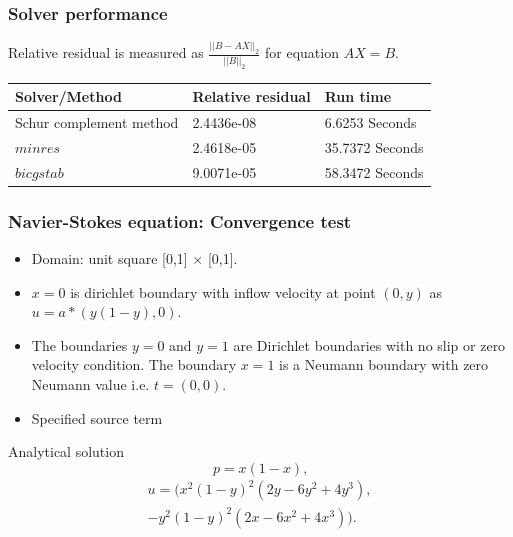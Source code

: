 \documentclass{beamer}
\begin{document}
\begin{frame}
\frametitle{Solver performance}

Relative residual is measured as $\frac{||B-AX||_2}{||B||_2}$ for equation $AX=B$.

\begin{longtable}{| p{} | p{} | p{} |}
\hline
\textbf{Solver/Method} & \textbf{Relative residual} & \textbf{Run time}\\
\hline
Schur complement method & 2.4436e-08 & 6.6253 Seconds\\
\hline
$minres$ & 2.4618e-05 & 35.7372 Seconds\\
\hline
$bicgstab$ & 9.0071e-05 & 58.3472 Seconds\\
\hline
\end{longtable}

\end{frame}
\begin{frame}
\frametitle{Navier-Stokes equation: Convergence test}
\begin{itemize}
\item Domain: unit square [0,1] $\times$ [0,1].
\item ${x=0}$ is dirichlet boundary with inflow velocity at point $(0,y)$ as $u = a*(y(1-y), 0)$.
\item The boundaries ${y = 0}$ and ${y = 1}$ are Dirichlet boundaries with no slip or zero velocity condition. The boundary ${x = 1}$ is a Neumann boundary with zero Neumann value i.e. $t = (0, 0)$. 
\item Specified source term
\end{itemize}
\begin{block}{Analytical solution}
\begin{equation}
p = x(1 - x) \textrm{,}
\end{equation}
\begin{equation} 
\begin{split}
u = (x^2(1-y)^2(2y-6y^2+4y^3),\\-y^2(1-y)^2(2x-6x^2+4x^3)) \textrm{.}
\end{split}
\end{equation}
\end{block}
\end{frame}
\end{document}
